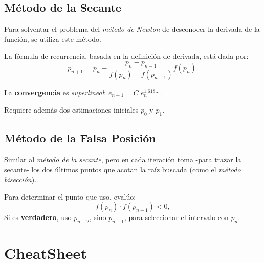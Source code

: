 \documentclass[10pt,a4paper]{article}
\begin{document}
\subsection{Método de la Secante}

Para solventar el problema del \textit{método de Newton} de desconocer la derivada de la función, se utiliza este método.

La fórmula de recurrencia, basada en la definición de derivada, está dada por:
\[p_{n+1} = p_{n} - \frac{p_{n}-p_{n-1}}{f(p_{n})-f(p_{n-1})}f(p_{n}) .\]

La \textbf{convergencia} es \textit{superlineal}: $e_{n+1}=C \; e_n^{1.618...}$.

Requiere además dos estimaciones iniciales $p_0$ y $p_1$.

\subsection{Método de la Falsa Posición}

Similar al \textit{método de la secante}, pero en cada iteración toma -para trazar la secante- los dos últimos puntos que acotan la raíz buscada (como el \textit{método bisección}).

Para determinar el punto que uso, evalúo: 
\[f(p_n)\cdot f(p_{n-1}) < 0,\]
Si es \textbf{verdadero}, uso $p_{n-2}$, sino $p_{n-1}$, para seleccionar el intervalo con ${p_n}$.

\pagebreak
\section*{CheatSheet}
\end{document}
